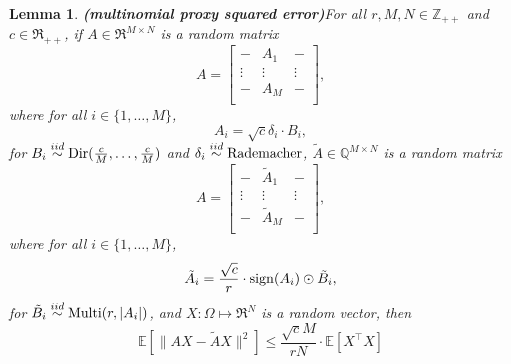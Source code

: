 \documentclass[twoside,11pt]{article}
\newtheorem{lemma}[theorem]{Lemma}
\def\sign{{\rm sign}}
\def\E{\mathbb{E}}
\begin{document}
\begin{lemma}{\bf (multinomial proxy squared error)}\label{le:multi_proxy}
    For all $r, M, N \in \mathbb{Z}_{++}$ and $c \in \Re_{++}$, if $A \in \Re^{M\times N}$ is a random matrix
    $$A = 
        \begin{bmatrix}
            - & A_1 & -\\
            \vdots & \vdots & \vdots\\
            - & A_M & -\\
        \end{bmatrix},
    $$
    where for all $i \in \{1, \ldots, M\}$,
    $$A_i = \sqrt{c}\delta_i\cdot B_i,$$
    for $B_i \overset{iid}{\sim} {\rm Dir}(\frac{c}{M}, \ldots, \frac{c}{M})$ and $\delta_i \overset{iid}{\sim} {\rm Rademacher}$, $\tilde{A}\in \mathbb{Q}^{M\times N}$ is a random matrix\\
    $$A = 
        \begin{bmatrix}
            - & \tilde{A}_1 & -\\
            \vdots & \vdots & \vdots\\
            - & \tilde{A}_M & -\\
        \end{bmatrix},
    $$
    where for all $i \in \{1, \ldots, M\}$,
    $$\tilde{A}_i = \frac{\sqrt{c}}{r}\cdot \sign(A_i)\odot \tilde{B}_i,$$
    for $\tilde{B}_i \overset{iid}{\sim} {\rm Multi}(r, |A_i|)$, and $X:\Omega\mapsto\Re^N$ is a random vector, then
    $$\E\left[\|AX - \tilde{A}X\|^2\right] \leq \frac{\sqrt{c}M}{rN}\cdot\E\left[X^\top X\right]$$
\end{lemma}
\end{document}
